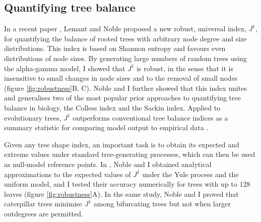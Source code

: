 \subsection{Quantifying tree balance}
In a recent paper \cite{lemant_robust_2022}, Lemant and Noble proposed a new robust, universal index, $J^1$, for quantifying the
balance of rooted trees with arbitrary node degree and size distributions. This index is based on
Shannon entropy and favours even distributions of node sizes. By generating large numbers of random trees
using the alpha-gamma model, I showed that $J^1$ is robust, in the sense
that it is insensitive to small changes in node sizes and to the removal of small nodes (figure \ref{fig:robustness}B, C).
Noble and I further showed that this index unites and generalises two of the most
popular prior approaches to quantifying tree balance in biology, the Colless index and the Sackin index.
Applied to evolutionary trees, $J^1$ outperforms conventional tree balance indices as a summary statistic
for comparing model output to empirical data \cite{noble_spatial_2022}.\par
Given any tree shape index, an important task is to obtain its expected and extreme values under standard
tree-generating processes, which can then be used as null-model reference points. In \cite{lemant_robust_2022},
Noble and I obtained analytical approximations to the expected values of $J^1$ under the Yule process and the uniform
model, and I tested their accuracy numerically for trees with up to $128$ leaves (figure \ref{fig:robustness}A). In the
same study, Noble and I proved that caterpillar trees minimise $J^1$ among bifurcating trees but not when larger
outdegrees are permitted.\par

